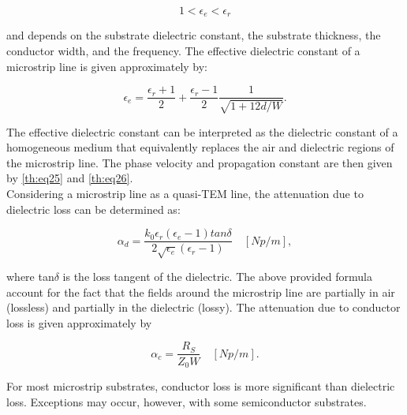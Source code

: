 \begin{equation}\label{th:eq34}
1 < \epsilon _{e} < \epsilon _{r}
\end{equation}

\noindent and depends on the substrate dielectric constant, the substrate thickness, the conductor
width, and the frequency. The effective dielectric constant of a microstrip line is given approximately by:

\begin{equation}\label{th:eq35}
\epsilon _{e}=\frac{\epsilon _{r}+1}{2}+\frac{\epsilon _{r}-1}{2}\frac{1}{\sqrt{1+12d/W}}.
\end{equation}

\noindent The effective dielectric constant can be interpreted as the dielectric constant of a homogeneous medium that equivalently replaces the air and dielectric regions of the microstrip line. The phase velocity and propagation constant are then given by \ref{th:eq25} and \ref{th:eq26}.
\\
\indent Considering a microstrip line as a quasi-TEM line, the attenuation due to dielectric loss can be determined as:

\begin{equation}\label{th:eq36}
\alpha _{d}=\frac{k_{0}\epsilon _{r}(\epsilon _{e}-1)tan\delta}{2\sqrt{\epsilon _{e}}(\epsilon _{r} -1)} \quad [Np/m],
\end{equation}

\noindent where tan$\delta $ is the loss tangent of the dielectric. The above provided formula account for the fact that the fields around the microstrip line are partially in air (lossless) and partially in the dielectric (lossy). The attenuation due to conductor loss is given approximately by

\begin{equation}\label{th:eq37}
\alpha _{c}=\frac{R_{S}}{Z_{0}W} \quad  [Np/m].
\end{equation}

\noindent For most microstrip substrates, conductor loss is more significant than dielectric loss. Exceptions may occur, however, with some semiconductor substrates.

\cleardoublepage